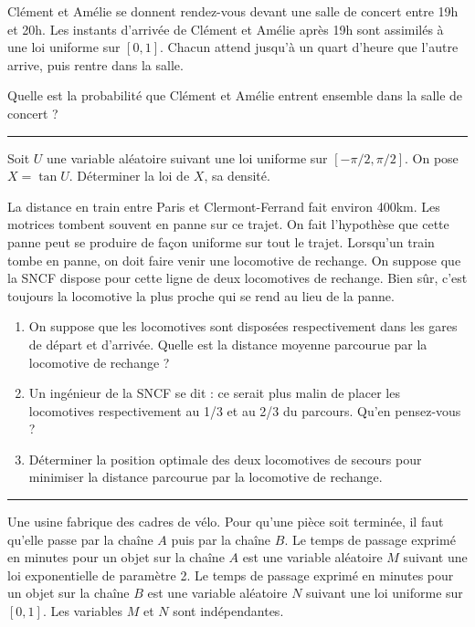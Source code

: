 \documentclass[../PolyS4.tex]{subfiles}
\begin{document}
Clément et Amélie se donnent rendez-vous devant une salle de concert entre 19h et 20h. Les instants d'arrivée de Clément et Amélie après 19h sont assimilés à une loi uniforme sur $[0,1]$. Chacun attend jusqu'à un quart d'heure que l'autre arrive, puis rentre dans la salle. 

Quelle est la probabilité que Clément et Amélie entrent ensemble dans la salle de concert ?

\vspace{1em}
\hrule
\vspace{1em}


Soit $U$ une variable aléatoire suivant une loi uniforme sur $[-\pi/2,\pi/2]$. On pose $X=\tan U$. Déterminer la loi de $X$, sa densité.

\newpage
{}

La distance en train entre Paris et Clermont-Ferrand fait environ 400km. Les motrices tombent souvent en panne sur ce trajet. On fait l'hypothèse que cette panne peut se produire de façon uniforme sur tout le trajet. Lorsqu'un train tombe en panne, on doit faire venir une locomotive de rechange. On suppose que la SNCF dispose pour cette ligne de deux locomotives de rechange. Bien sûr, c'est toujours la locomotive la plus proche qui se rend au lieu de la panne.

\begin{enumerate}
\item On suppose que les locomotives sont disposées respectivement dans les gares de départ et d'arrivée. Quelle est la distance moyenne parcourue par la locomotive de rechange ?
\item Un ingénieur de la SNCF se dit : ce serait plus malin de placer les locomotives respectivement au 1/3 et au 2/3 du parcours. Qu'en pensez-vous ?
\item Déterminer la position optimale des deux locomotives de secours pour minimiser la distance parcourue par la locomotive de rechange.
\end{enumerate}

\vspace{1em}
\hrule
\vspace{1em}


Une usine fabrique des cadres de vélo. Pour qu'une pièce soit terminée, il faut qu'elle passe par la chaîne $A$ puis par la chaîne $B$. Le temps de passage exprimé en minutes pour un objet sur la chaîne $A$ est une variable aléatoire $M$ suivant une loi exponentielle de paramètre 2. Le temps de passage exprimé en minutes pour un objet sur la chaîne $B$ est une variable aléatoire $N$ suivant une loi uniforme sur $[0,1]$. Les variables $M$ et $N$ sont indépendantes.
\end{document}
